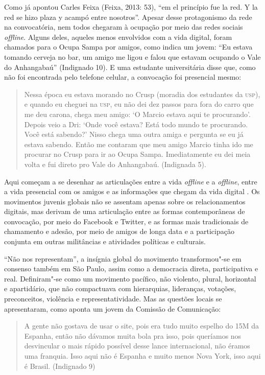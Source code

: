 Como já apontou Carles Feixa (Feixa, 2013: 53), ``em el princípio fue la
red. Y la red se hizo plaza y acampó entre nosotros''. Apesar desse
protagonismo da rede na convocatória, nem todos chegaram à ocupação por
meio das redes sociais \emph{\emph{offline}}. Alguns deles, aqueles menos
envolvidos com a vida digital, foram chamados para o Ocupa Sampa por
amigos, como indica um jovem: ``Eu estava tomando cerveja no bar, um
amigo me ligou e falou que estavam ocupando o Vale do Anhangabaú''
(Indignado 10). E uma estudante universitária disse que, como não foi
encontrada pelo telefone celular, a convocação foi presencial mesmo:

\begin{quote}
Nessa época eu estava morando no Crusp (moradia dos estudantes da \textsc{usp}),
e quando eu cheguei na \textsc{usp}, eu não dei dez passos para fora do carro que
me deu carona, chega meu amigo: `O Marcio estava aqui te procurando'.
Depois veio a Dri: `Onde você estava? Está todo mundo te procurando.
Você está sabendo?' Nisso chega uma outra amiga e pergunta se eu já
estava sabendo. Então me contaram que meu amigo Marcio tinha ido me
procurar no Crusp para ir ao Ocupa Sampa. Imediatamente eu dei meia
volta e fui direto pro Vale do Anhangabaú. (Indignada 5).
\end{quote}

Aqui começam a se desenhar as articulações entre a vida \emph{\emph{offline}} e
a \emph{\emph{offline}}, entre a vida presencial com os amigos e as
informações que chegam da vida digital . Os movimentos juvenis globais
não se assentam apenas sobre os relacionamentos digitais, mas derivam de
uma articulação entre as formas contemporâneas de convocação, por meio
do Facebook e Twitter, e as formas mais tradicionais de chamamento e
adesão, por meio de amigos de longa data e a participação conjunta em
outras militâncias e atividades políticas e culturais.

``Não nos representam'', a insígnia global do movimento transformou"-se
em consenso também em São Paulo, assim como a democracia direta,
participativa e real. Definiram"-se como um movimento pacífico, não
violento, plural, horizontal e apartidário, que não compactuava com
hierarquias, lideranças, votações, preconceitos, violência e
representatividade. Mas as questões locais se apresentaram, como aponta
um jovem da Comissão de Comunicação:

\begin{quote}
A gente não gostava de usar o site, pois era tudo muito espelho do 15M
da Espanha, então não dávamos muita bola pra isso, pois queríamos nos
desvincular o mais rápido possível desse lance internacional, não éramos
uma franquia. Isso aqui não é Espanha e muito menos Nova York, isso aqui
é Brasil. (Indignado 9)
\end{quote}

